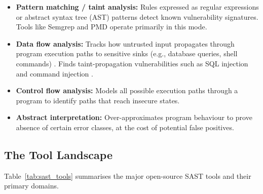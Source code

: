 \begin{itemize}
  \item \textbf{Pattern matching / taint analysis:} Rules expressed as regular expressions or abstract syntax tree (AST) patterns detect known vulnerability signatures. Tools like Semgrep and PMD operate primarily in this mode.

  \item \textbf{Data flow analysis:} Tracks how untrusted input propagates through program execution paths to sensitive sinks (e.g., database queries, shell commands) \cite{newsome2005dynamic,enck2014taintdroid}. Finds taint-propagation vulnerabilities such as SQL injection and command injection \cite{halfond2006classification}.

  \item \textbf{Control flow analysis:} Models all possible execution paths through a program to identify paths that reach insecure states.

  \item \textbf{Abstract interpretation:} Over-approximates program behaviour to prove absence of certain error classes, at the cost of potential false positives.
\end{itemize}

\subsection{The Tool Landscape}

Table~\ref{tab:sast_tools} summarises the major open-source SAST tools and their primary domains.

